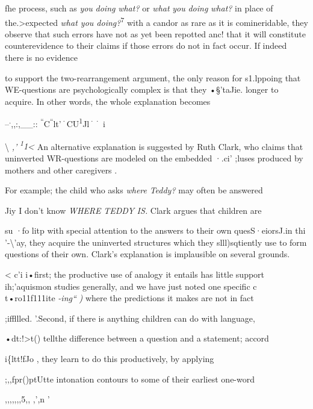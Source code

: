 fhe process, such as \textit{you} \textit{doing} \textit{what?} or \textit{what} \textit{you} \textit{doing} \textit{what?} in place of the.{\textgreater}expected \textit{what you doing?}\textsuperscript{7} with a candor as rare as it is comineridable, they observe that such errors have not as yet been repotted anc! that it will constitute counterevidence to their claims if those errors do not in fact occur. If indeed there is no evidence

to support the two-rearrangement argument, the only reason for s1.lppoing that WE-questions are psychologically complex is that they 
•§'taJie. longer to acquire. In other words, the whole explanation becomes

--\textsuperscript{.},,:,\_\_:: \textsuperscript{``}C\textsuperscript{``}lt'\textsuperscript{·}CU\textsuperscript{1}Jl\textsuperscript{·}\textsuperscript{·} i

{\textbackslash} \textit{,'} \textit{\textsuperscript{1}}\textit{1{\textless}} An alternative explanation is suggested by Ruth Clark, who
claims that uninverted WR-questions are modeled on the embedded
·.ci' ;luses produced by mothers and other caregivers \citep{Clark1977}.

For example; the child who asks \textit{where} \textit{Teddy?} may often be answered

Jiy I don't know \textit{WHERE} \textit{TEDDY} \textit{IS.} Clark argues that children are

su ·fo litp with special attention to the answers to their own ques\-S·eiorsJ.in thi '-{\textbackslash}'ay, they acquire the uninverted structures which they
slll)sqtiently use to form questions of their own. Clark's explanation is implausible on several grounds.

{\textless} c'i i•first; the productive use of analogy it entails has little support ih;'aquismon studies generally, and we have just noted one specific c t•ro11f111ite \textit{-i}\textit{n}\textit{g``} \textit{)} where the predictions it makes are not in fact

;iffllled. '.Second, if there is anything children can do with language,

•dt:!{\textgreater}t() tellthe difference between a question and a statement; accord\-

i\{ltt!fJo \citet{Halliday1975}, they learn to do this productively, by applying

;,,fpr()ptUtte intonation contours to some of their earliest one-word

,,,,,,,5,, ,',n '


